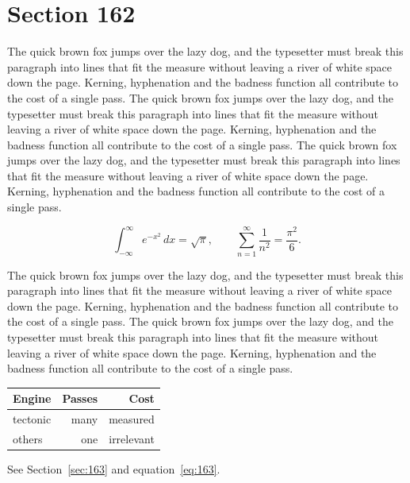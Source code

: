 \documentclass{article}
\begin{document}
\section{Section 162}
\label{sec:162}
The quick brown fox jumps over the lazy dog, and the typesetter must break this paragraph into lines that fit the measure without leaving a river of white space down the page. Kerning, hyphenation and the badness function all contribute to the cost of a single pass. The quick brown fox jumps over the lazy dog, and the typesetter must break this paragraph into lines that fit the measure without leaving a river of white space down the page. Kerning, hyphenation and the badness function all contribute to the cost of a single pass. The quick brown fox jumps over the lazy dog, and the typesetter must break this paragraph into lines that fit the measure without leaving a river of white space down the page. Kerning, hyphenation and the badness function all contribute to the cost of a single pass. 

\begin{equation}\label{eq:162}
\int_{-\infty}^{\infty} e^{-x^{2}}\,dx = \sqrt{\pi}, \qquad
\sum_{n=1}^{\infty} \frac{1}{n^{2}} = \frac{\pi^{2}}{6}.
\end{equation}

The quick brown fox jumps over the lazy dog, and the typesetter must break this paragraph into lines that fit the measure without leaving a river of white space down the page. Kerning, hyphenation and the badness function all contribute to the cost of a single pass. The quick brown fox jumps over the lazy dog, and the typesetter must break this paragraph into lines that fit the measure without leaving a river of white space down the page. Kerning, hyphenation and the badness function all contribute to the cost of a single pass. 

\begin{center}
\begin{tabular}{lrr}
\toprule
Engine & Passes & Cost \\
\midrule
tectonic & many & measured \\
others & one & irrelevant \\
\bottomrule
\end{tabular}
\end{center}

See Section~\ref{sec:163} and equation~\eqref{eq:163}.
\end{document}

